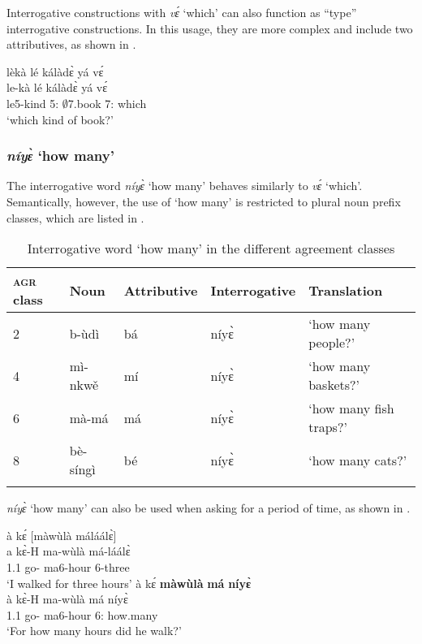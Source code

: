 Interrogative constructions with {\itshape vɛ́} `which' can also function as ``type'' interrogative constructions. In this usage, they are more complex and include two attributives, as shown in .

\ea\label{sort}
  \glll     lèkà lé kálàdɛ̀ yá vɛ́ \\
         le-kà lé kálàdɛ̀ yá vɛ́ \\
                le5-kind 5:{\ATT} $\emptyset$7.book 7:{\ATT} which \\
    \trans `which kind of book?'
\z



\subsubsection{{\itshape níyɛ̀} `how many'}
\label{sec:howmany}

The interrogative word {\itshape níyɛ̀} `how many' behaves similarly to {\itshape vɛ́} `which'. Semantically, however, the use of `how many' is restricted to plural noun prefix classes, which are listed in .

\begin{table}
\begin{tabularx}{\textwidth}{lllXl}
 \lsptoprule
\textsc{agr} class & Noun &  Attributive & Interrogative & Translation \\
  \midrule
 2 & b-ùdì &  bá & níyɛ̀ & `how many people?'  \\
4 & mì-nkwě & mí & níyɛ̀ & `how many baskets?' \\
6 & mà-má & má & níyɛ̀ & `how many fish traps?' \\
8 & bè-síngì &  bé & níyɛ̀ & `how many cats?' \\
  \lspbottomrule
\end{tabularx}
\caption{Interrogative word `how many' in the different agreement classes}
\label{Tab:howmany}
\end{table}

{\itshape níyɛ̀} `how many' can also be used when asking for a period of time, as shown in .

\ea\label{niye}
\ea\label{niye1}
 \glll  à kɛ́ [màwùlà máláálɛ̀]  \\
        a kɛ̀-H {\db}ma-wùlà má-láálɛ̀\\
          1.{\PST}1 go-{\R} {\db}ma6-hour 6-three  \\
    \trans `I walked for three hours'
\ex \label{niye2}
  \glll    à kɛ́ {\bfseries màwùlà} {\bfseries má} {\bfseries níyɛ̀} \\
	à kɛ̀-H ma-wùlà má níyɛ̀ \\
              1.{\PST}1 go-{\R} ma6-hour 6:{\ATT} how.many\\
    \trans `For how many hours did he walk?'
\z
\z

